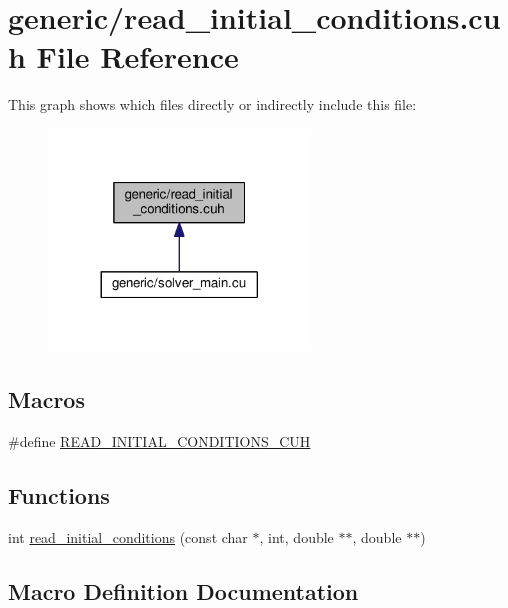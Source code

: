 \hypertarget{read__initial__conditions_8cuh}{}\section{generic/read\+\_\+initial\+\_\+conditions.cuh File Reference}
\label{read__initial__conditions_8cuh}
This graph shows which files directly or indirectly include this file\+:\nopagebreak
\begin{figure}[H]
\begin{center}
\leavevmode
\includegraphics[width=197pt]{read__initial__conditions_8cuh__dep__incl}
\end{center}
\end{figure}
\subsection*{Macros}
\begin{DoxyCompactItemize}
\item 
\#define \hyperlink{read__initial__conditions_8cuh_aa94bd31760d037d12c0cfce818fa6ca4}{R\+E\+A\+D\+\_\+\+I\+N\+I\+T\+I\+A\+L\+\_\+\+C\+O\+N\+D\+I\+T\+I\+O\+N\+S\+\_\+\+C\+UH}
\end{DoxyCompactItemize}
\subsection*{Functions}
\begin{DoxyCompactItemize}
\item 
int \hyperlink{read__initial__conditions_8cuh_af316c999bd8f21073480df848cca5225}{read\+\_\+initial\+\_\+conditions} (const char $\ast$, int, double $\ast$$\ast$, double $\ast$$\ast$)
\end{DoxyCompactItemize}


\subsection{Macro Definition Documentation}

